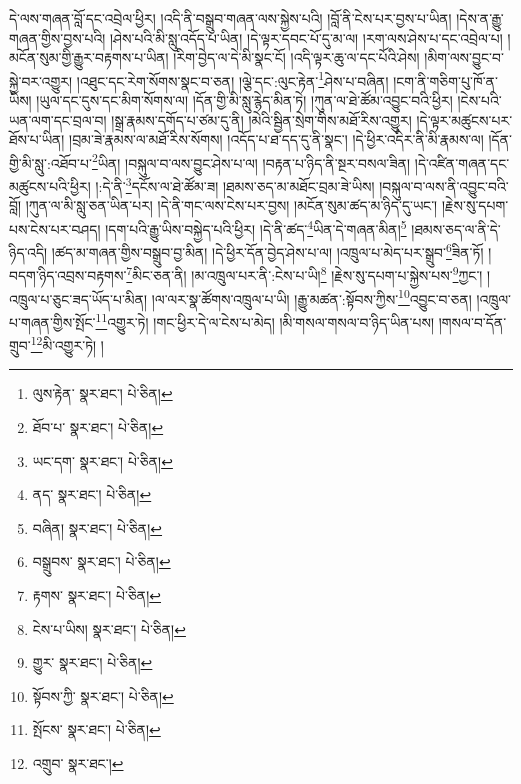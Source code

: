 དེ་ལས་གཞན་བློ་དང་འབྲེལ་ཕྱིར། །འདི་ནི་བསྒྲུབ་གཞན་ལས་སྐྱེས་པའི། །བློ་ནི་ངེས་པར་བྱས་པ་ཡིན། །དེས་ན་རྒྱུ་གཞན་གྱིས་བྱས་པའི། །ཤེས་པའི་མི་སླུ་འདོད་པ་ཡིན། །དེ་ལྟར་དབང་པོ་དུ་མ་ལ། །རག་ལས་ཤེས་པ་དང་འབྲེལ་པ། །མངོན་སུམ་གྱི་རྒྱུར་བརྟགས་པ་ཡིན། །རིག་བྱེད་ལ་དེ་མི་སྣང་ངོ། །འདི་ལྟར་ཆུ་ལ་དང་པོའི་ཤེས། །མིག་ལས་བྱུང་བ་སྐྱེ་བར་འགྱུར། །འཐུང་དང་རེག་སོགས་སྣང་བ་ཅན། །ལྕེ་དང་:ལུང་རྟེན་\footnote{ལུས་རྟེན་  སྣར་ཐང་།  པེ་ཅིན། }ཤེས་པ་བཞིན། །ངག་ནི་གཅིག་པུ་ཁོ་ན་ཡིས། །ཡུལ་དང་དུས་དང་མིག་སོགས་ལ། །དོན་གྱི་མི་སླུ་རྙེད་མིན་ཏེ། །ཀུན་ལ་ཐེ་ཚོམ་འབྱུང་བའི་ཕྱིར། །ངེས་པའི་ཡན་ལག་དང་བྲལ་བ། །སྒྲ་རྣམས་དགོད་པ་ཙམ་དུ་ནི། །མེའི་སྦྱིན་སྲེག་གིས་མཐོ་རིས་འགྱུར། །དེ་ལྟར་མཚུངས་པར་ཐོས་པ་ཡིན། །བྲམ་ཟེ་རྣམས་ལ་མཐོ་རིས་སོགས། །འདོད་པ་ཐ་དད་དུ་ནི་སྣང་། །དེ་ཕྱིར་འདིར་ནི་མི་རྣམས་ལ། །དོན་གྱི་མི་སླུ་:འཐོབ་པ་\footnote{ཐོབ་པ་  སྣར་ཐང་།  པེ་ཅིན། }ཡིན། །བསྐུལ་བ་ལས་བྱུང་ཤེས་པ་ལ། །བརྟན་པ་ཉིད་ནི་སྔར་བསལ་ཟིན། །དེ་འཛིན་གཞན་དང་མཚུངས་པའི་ཕྱིར། །:དེ་ནི་\footnote{ཡང་དག་  སྣར་ཐང་།  པེ་ཅིན། }དངོས་ལ་ཐེ་ཚོམ་ཟ། །ཐམས་ཅད་མ་མཐོང་བྲམ་ཟེ་ཡིས། །བསྐུལ་བ་ལས་ནི་འབྱུང་བའི་བློ། །ཀུན་ལ་མི་སླུ་ཅན་ཡིན་པར། །དེ་ནི་གང་ལས་ངེས་པར་བྱས། །མངོན་སུམ་ཚད་མ་ཉིད་དུ་ཡང་། །རྗེས་སུ་དཔག་པས་ངེས་པར་བཤད། །དག་པའི་རྒྱུ་ཡིས་བསྐྱེད་པའི་ཕྱིར། །དེ་ནི་ཚད་\footnote{ནད་  སྣར་ཐང་།  པེ་ཅིན། }ཡིན་དེ་གཞན་མིན།\footnote{བཞིན།  སྣར་ཐང་།  པེ་ཅིན། } །ཐམས་ཅད་ལ་ནི་དེ་ཉིད་འདི། །ཚད་མ་གཞན་གྱིས་བསྒྲུབ་བྱ་མིན། །དེ་ཕྱིར་དོན་བྱེད་ཤེས་པ་ལ། །འཁྲུལ་པ་མེད་པར་སྒྲུབ་\footnote{བསྒྲུབས་  སྣར་ཐང་།  པེ་ཅིན། }ཟིན་ཏོ། །བདག་ཉིད་འབྲས་བརྟགས་\footnote{རྟགས་  སྣར་ཐང་།  པེ་ཅིན། }མིང་ཅན་ནི། །མ་འཁྲུལ་པར་ནི་:ངེས་པ་ཡི།\footnote{ངེས་པ་ཡིས།  སྣར་ཐང་།  པེ་ཅིན། } །རྗེས་སུ་དཔག་པ་སྐྱེས་པས་\footnote{གྱུར་  སྣར་ཐང་།  པེ་ཅིན། }ཀྱང་། །འཁྲུལ་པ་ཅུང་ཟད་ཡོད་པ་མིན། །ལ་ལར་སྣ་ཚོགས་འཁྲུལ་པ་ཡི། །རྒྱུ་མཚན་:སྟོབས་ཀྱིས་\footnote{སྟོབས་ཀྱི་  སྣར་ཐང་།  པེ་ཅིན། }འབྱུང་བ་ཅན། །འཁྲུལ་པ་གཞན་གྱིས་སྤོང་\footnote{སྤོངས་  སྣར་ཐང་།  པེ་ཅིན། }འགྱུར་ཏེ། །གང་ཕྱིར་དེ་ལ་ངེས་པ་མེད། །མི་གསལ་གསལ་བ་ཉིད་ཡིན་པས། །གསལ་བ་དོན་གྲུབ་\footnote{འགྲུབ་  སྣར་ཐང་། }མི་འགྱུར་ཏེ། །
